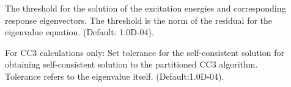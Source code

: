 \begin{description}
\item[] 

The threshold for the solution of the excitation energies and
corresponding response eigenvectors. 
The threshold is the norm of the residual for the eigenvalue equation.
(Default: 1.0D-04). 

%
%
%
%
%
%
%
\item[] 
%
For CC3 calculations only: 
Set tolerance for the self-consistent solution for obtaining self-consistent
solution to the partitioned CC3 algorithm.
Tolerance refers to the eigenvalue itself.
(Default:1.0D-04).

%
%
\end{description}
